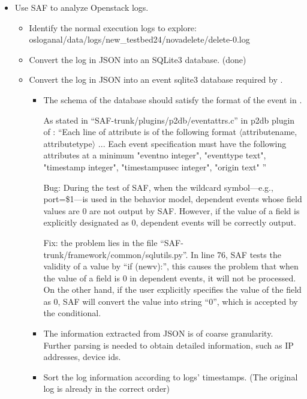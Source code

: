 \documentclass{article}
\begin{document}
\begin{itemize}
\item Use SAF to analyze Openstack logs.
  \begin{itemize}
  \item Identify the normal execution logs to explore: osloganal/data/logs/new\_testbed24/novadelete/delete-0.log
  \item Convert the log in JSON into an SQLite3 database. (done)
  \item Convert the log in JSON into an event sqlite3 database required by \saf{}.
    \begin{itemize}
    \item The schema of the database should satisfy the format of the event in
      \saf{}.
      
      As stated in ``SAF-trunk/plugins/p2db/eventattrs.c'' in p2db plugin of \saf{}: ``Each line of
      attribute is of the following format $\langle$attributename,
      attributetype$\rangle$ ... Each event specification must have the
      following attributes at a minimum "eventno integer", "eventtype text",
      "timestamp integer",	"timestampusec integer", "origin text" ''

      Bug: During the test of SAF, when the wildcard symbol---e.g.,
      port=\$1---is used in the behavior model, dependent events
      whose field values are 0 are not output by SAF. However, if the value of a
      field is explicitly designated as 0, dependent events will be correctly
      output.

      Fix: the problem lies in the file
      ``SAF-trunk/framework/common/sqlutils.py''. In line 76, SAF tests the
      validity of a value by ``if (newv):'', this causes the problem that when
      the value of a field is 0 in dependent events, it will not be
      processed. On the other hand, if the user explicitly specifies the value
      of the field as 0, SAF will convert the value into string ``0'', which
      is accepted by the conditional.
    \item The information extracted from JSON is of coarse granularity. Further
      parsing is needed to obtain detailed information, such as IP addresses,
      device ids.
      
    \item Sort the log information according to logs' timestamps. (The original
      log is already in the correct order)
    \end{itemize}


\end{itemize}
\end{itemize}
\end{document}
